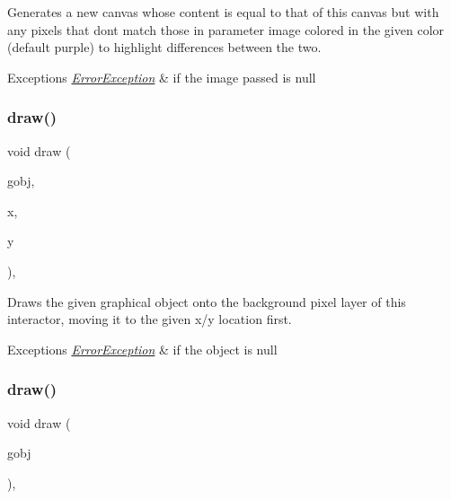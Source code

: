 Generates a new canvas whose content is equal to that of this canvas but with any pixels that don\textquotesingle{}t match those in parameter \textquotesingle{}image\textquotesingle{} colored in the given color (default purple) to highlight differences between the two. 


\begin{DoxyExceptions}{Exceptions}
{\em \mbox{\hyperlink{classErrorException}{Error\+Exception}}} & if the image passed is null \\
\hline
\end{DoxyExceptions}
\mbox{\label{classGDrawingSurface_acc3825d7a24815d1e2f78e7c3ffea6cc}} 
\subsubsection{\texorpdfstring{draw()}{draw()}\hspace{0.1cm}{\footnotesize\ttfamily [1/4]}}
{\footnotesize\ttfamily void draw (\begin{DoxyParamCaption}\item[{\mbox{\hyperlink{classGObject}{G\+Object}} $\ast$}]{gobj,  }\item[{double}]{x,  }\item[{double}]{y }\end{DoxyParamCaption})\hspace{0.3cm}{\ttfamily [virtual]}, {\ttfamily [inherited]}}



Draws the given graphical object onto the background pixel layer of this interactor, moving it to the given x/y location first. 


\begin{DoxyExceptions}{Exceptions}
{\em \mbox{\hyperlink{classErrorException}{Error\+Exception}}} & if the object is null \\
\hline
\end{DoxyExceptions}
\mbox{\label{classGDrawingSurface_a022a8d51c7fabcd79a0c809233e93453}} 
\subsubsection{\texorpdfstring{draw()}{draw()}\hspace{0.1cm}{\footnotesize\ttfamily [2/4]}}
{\footnotesize\ttfamily void draw (\begin{DoxyParamCaption}\item[{\mbox{\hyperlink{classGObject}{G\+Object}} \&}]{gobj }\end{DoxyParamCaption})\hspace{0.3cm}{\ttfamily [virtual]}, {\ttfamily [inherited]}}



